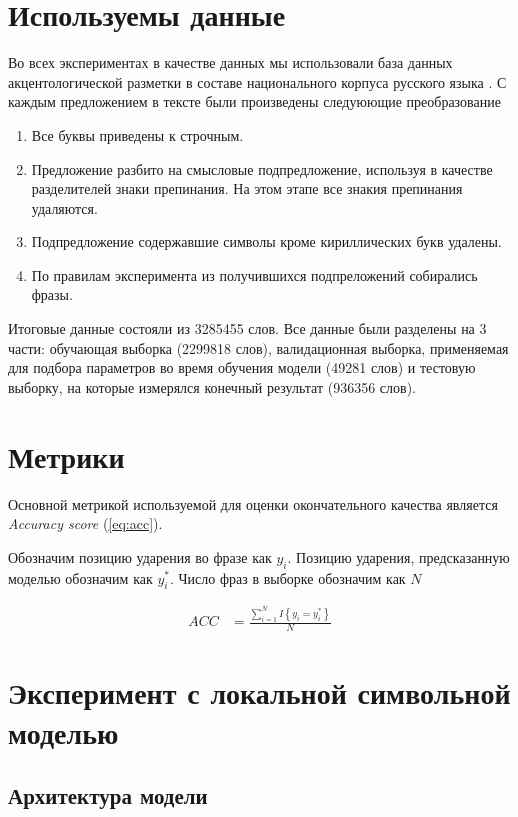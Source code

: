 \documentclass[14pt, a4paper, russian]{report}
\begin{document}
\begin{normalsize}
\section{Используемы данные}
Во всех экспериментах в качестве данных мы использовали база данных акцентологической разметки в составе национального корпуса русского языка \cite{grishina}. С каждым предложением в тексте были произведены следуюющие преобразование
\begin{enumerate}
	\item Все буквы приведены к строчным.
	\item Предложение разбито на смысловые подпредложение, используя в качестве разделителей знаки препинания. На этом этапе все знакия препинания удаляются.
	\item Подпредложение содержавшие символы кроме кириллических букв удалены.
	\item По правилам эксперимента из получившихся подпреложений собирались фразы.
\end{enumerate}
Итоговые данные состояли из 3285455  слов. Все данные были разделены на 3 части: обучающая выборка (2299818 слов), валидационная выборка, применяемая для подбора параметров во время обучения модели (49281 слов) и тестовую  выборку, на которые измерялся конечный результат (936356 слов).
\section{Метрики}
Основной метрикой используемой для оценки окончательного качества является \textit{Accuracy score}  (\ref{eq:acc}). 

Обозначим позицию ударения во фразе как $y_i$. Позицию ударения, предсказанную моделью обозначим как $y^*_i$. Число фраз в выборке обозначим как $N$

\begin{align}
\label{eq:acc} ACC &= \frac{\sum\limits_{i=1}^{N}I \left\{y_i = y^*_i\right\}}{N} 
\end{align}

\section{Эксперимент с локальной символьной моделью}

\subsection{Архитектура модели}




\end{normalsize}
\end{document}
